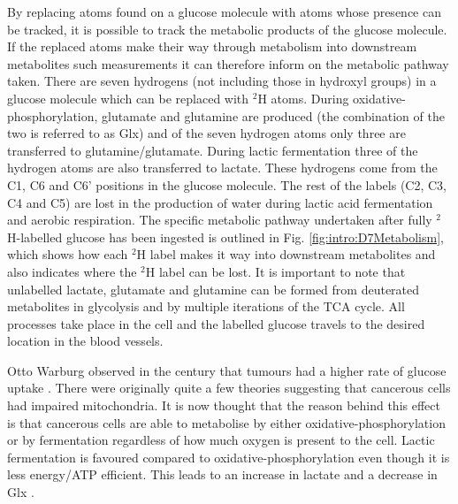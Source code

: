 By replacing atoms found on a glucose molecule with atoms whose presence can be tracked, it is possible to track the metabolic products of the glucose molecule. If the replaced atoms make their way through metabolism into downstream metabolites such measurements it can therefore inform on the metabolic pathway taken. There are seven hydrogens (not including those in hydroxyl groups) in a glucose molecule which can be replaced with $^2$H atoms. During oxidative-phosphorylation, glutamate and glutamine are produced (the combination of the two is referred to as Glx) and of the seven hydrogen atoms only three are transferred to glutamine/glutamate. During lactic fermentation three of the hydrogen atoms are also transferred to lactate. These hydrogens come from the C1, C6 and C6' positions in the glucose molecule. The rest of the labels (C2, C3, C4 and C5) are lost in the production of water during lactic acid fermentation and aerobic respiration. The specific metabolic pathway undertaken after fully $^2$H-labelled glucose has been ingested is outlined in Fig. \ref{fig:intro:D7Metabolism}, which shows how each $^2$H label makes it way into downstream metabolites and also indicates where the $^2$H label can be lost. It is important to note that unlabelled lactate, glutamate and glutamine can be formed from deuterated metabolites in glycolysis and by multiple iterations of the \ac{TCA} cycle. All processes take place in the cell and the labelled glucose travels to the desired location in the blood vessels.

Otto Warburg observed in the  century that tumours had a higher rate of glucose uptake \cite{WarburgBerlin-Dahlem1925TheCells,Warburg1956OnCells}. There were originally quite a few theories suggesting that cancerous cells had impaired mitochondria. It is now thought that the reason behind this effect is that cancerous cells are able to metabolise by either oxidative-phosphorylation or by fermentation regardless of how much oxygen is present to the cell. Lactic fermentation is favoured compared to oxidative-phosphorylation even though it is less energy/\ac{ATP} efficient. This leads to an increase in lactate and a decrease in Glx \cite{Romero-Garcia2011TumorView}.

